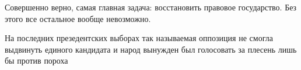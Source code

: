 \begin{itemize}

Совершенно верно, самая главная задача: восстановить правовое государство. Без
этого все остальное вообще невозможно.


На последних презедентских выборах так называемая оппозиция не смогла выдвинуть
единого кандидата и народ вынужден был голосовать за плесень лишь бы против
пороха


\end{itemize} %
